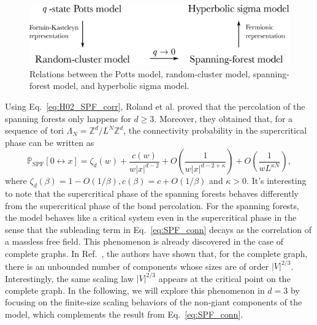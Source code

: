 \begin{figure}[b]
	\centering
	\vspace{5ex}%
	\includegraphics[width=0.8\columnwidth]{figures/diagram/relation.pdf}
	\caption{Relations between the Potts model, random-cluster model, spanning-forest model, and hyperbolic sigma model.}
	\label{fig:model_relation}
	\vspace{3ex}%
\end{figure}

Using Eq.~\eqref{eq:H02_SPF_corr}, Roland et al. proved that the percolation of the spanning forests only happens for $d\geq 3$.
Moreover, they obtained that, for a sequence of tori $\Lambda_N = \mathbb{Z}^d/L^N\mathbb{Z}^d$, the connectivity probability
in the supercritical phase can be written as
\begin{equation}\label{eq:SPF_conn}
	\mathbb{P}_{\text{SPF}}[0\leftrightarrow x] = \zeta_{d}(w)+\frac{c(w)}{w|x|^{d-2}}+O\left(\frac{1}{w|x|^{d-2+\kappa}}\right)+O\left(\frac{1}{w L^{\kappa N}}\right),
\end{equation}
where $\zeta_{d}(\beta)=1-O(1 / \beta), c(\beta)=c+O(1 / \beta)$ and $\kappa > 0$. It's interesting to note that the supercritical
phase of the spanning forests behaves differently from the supercritical phase of the bond percolation. For the spanning forests,
the model behaves like a critical system even in the supercritical phase in the sense that the subleading term in Eq.~\eqref{eq:SPF_conn}
decays as the correlation of a massless free field. This phenomenon is already discovered in the case of complete graphs. 
In Ref.~, the authors have shown that, for the complete graph, there is an unbounded number of components whose sizes are of order $|V|^{2/3}$.
Interestingly, the same scaling law $|V|^{2/3}$ appears at the critical point on the complete graph. In the following, 
we will explore this phenomenon in $d=3$ by focusing on the finite-size scaling behaviors of the non-giant components of the model, which
complements the result from Eq.~\eqref{eq:SPF_conn}.
